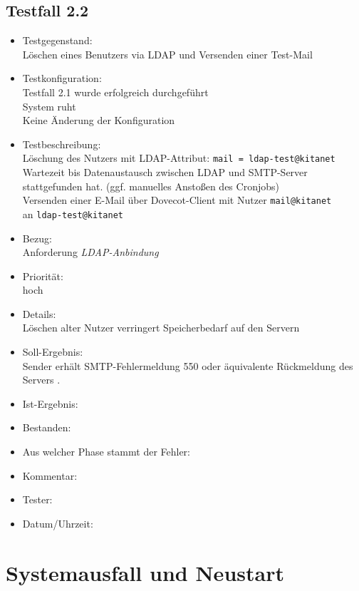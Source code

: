 \subsection{Testfall 2.2}
\begin{itemize}
	\item Testgegenstand:\\
Löschen eines Benutzers via LDAP und Versenden einer Test-Mail
	\item Testkonfiguration:\\
	Testfall 2.1 wurde erfolgreich durchgeführt\\
	System ruht\\
	Keine Änderung der Konfiguration
	\item Testbeschreibung:\\
	Löschung des Nutzers mit LDAP-Attribut: \verb+mail = ldap-test@kitanet+\\
	Wartezeit bis Datenaustausch zwischen LDAP und SMTP-Server stattgefunden hat. (ggf. manuelles Anstoßen des Cronjobs)\\
	Versenden einer E-Mail über Dovecot-Client mit Nutzer \verb+mail@kitanet+ \\ an \verb+ldap-test@kitanet+
	\item Bezug:\\
	Anforderung \textit{LDAP-Anbindung}
	\item Priorität:\\
	hoch
	\item Details:\\
	Löschen alter Nutzer verringert Speicherbedarf auf den Servern
	\item Soll-Ergebnis:\\
	Sender erhält SMTP-Fehlermeldung 550 oder äquivalente Rückmeldung des Servers \citep[vgl.][16]{rfc821}.
	\item Ist-Ergebnis:\\
	\item Bestanden:\\
	\item Aus welcher Phase stammt der Fehler:\\
	\item Kommentar:\\
	\item Tester:\\
	\item Datum/Uhrzeit:\\
\end{itemize}



\section{Systemausfall und Neustart}
